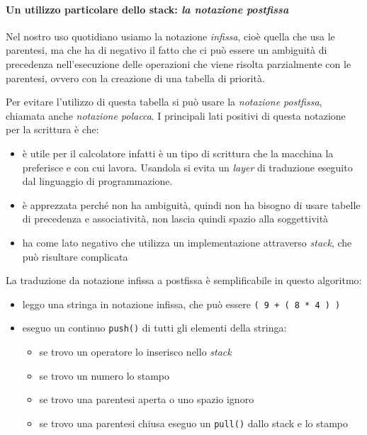 \documentclass[
  paper=a4,
  oneside  ,captions=tableheading
]{scrbook}
\newcommand{\passthrough}[1]{#1}
\providecommand{\tightlist}{%
  \setlength{\itemsep}{0pt}\setlength{\parskip}{0pt}}
\begin{document}
\hypertarget{un-utilizzo-particolare-dello-stack-la-notazione-postfissa}{%
\paragraph{\texorpdfstring{Un utilizzo particolare dello stack: \emph{la
notazione
postfissa}}{Un utilizzo particolare dello stack: la notazione postfissa}}\label{un-utilizzo-particolare-dello-stack-la-notazione-postfissa}}

Nel nostro uso quotidiano usiamo la notazione \emph{infissa}, cioè
quella che usa le parentesi, ma che ha di negativo il fatto che ci può
essere un ambiguità di precedenza nell'esecuzione delle operazioni che
viene risolta parzialmente con le parentesi, ovvero con la creazione di
una tabella di priorità.

Per evitare l'utilizzo di questa tabella si può usare la \emph{notazione
postfissa}, chiamata anche \emph{notazione polacca}. I principali lati
positivi di questa notazione per la scrittura è che:

\begin{itemize}
\tightlist
\item
  è utile per il calcolatore infatti è un tipo di scrittura che la
  macchina la preferisce e con cui lavora. Usandola si evita un
  \emph{layer} di traduzione eseguito dal linguaggio di programmazione.
\item
  è apprezzata perché non ha ambiguità, quindi non ha bisogno di usare
  tabelle di precedenza e associatività, non lascia quindi spazio alla
  soggettività
\item
  ha come lato negativo che utilizza un implementazione attraverso
  \emph{stack}, che può risultare complicata
\end{itemize}

La traduzione da notazione infissa a postfissa è semplificabile in
questo algoritmo:

\begin{itemize}
\tightlist
\item
  leggo una stringa in notazione infissa, che può essere
  \passthrough{\lstinline!( 9 + ( 8 * 4 ) )!}
\item
  eseguo un continuo \passthrough{\lstinline!push()!} di tutti gli
  elementi della stringa:

  \begin{itemize}
  \tightlist
  \item
    se trovo un operatore lo inserisco nello \emph{stack}
  \item
    se trovo un numero lo stampo
  \item
    se trovo una parentesi aperta o uno spazio ignoro
  \item
    se trovo una parentesi chiusa eseguo un
    \passthrough{\lstinline!pull()!} dallo stack e lo stampo
  \end{itemize}
\end{itemize}
\end{document}
